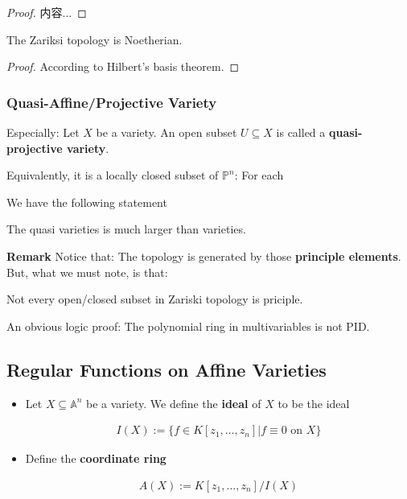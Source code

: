 \documentclass[Total.tex]{subfiles}
\begin{document}
			\begin{proof}
				内容...
			\end{proof}
			
			\begin{proposition}
				The Zariksi topology is Noetherian.
			\end{proposition}
			
			\begin{proof}
				According to Hilbert's basis theorem. 
			\end{proof}
			
			\subsubsection{Quasi-Affine/Projective Variety}
			
			\begin{Def}
				Especially: Let $X$ be a variety. An open subset $U\subseteq X$ is called a \textbf{quasi-projective variety}. 
				
				Equivalently, it is a locally closed subset of $\mathbb{P}^n$: For each 
			\end{Def}
			
			We have the following statement
			
			\begin{center}
				The quasi varieties is much larger than varieties.
			\end{center}
			
			\textbf{Remark} Notice that: The topology is generated by those \textbf{principle elements}. But, what we must note, is that: 
			
			\begin{center}
				Not every open/closed subset in Zariski topology is priciple.
			\end{center}
			
			An obvious logic proof: The polynomial ring in multivariables is not PID.
			
		
		
			\subsection{Regular Functions on Affine Varieties}
			
				\begin{Def}
					\begin{itemize}
						\item Let $X\subseteq \mathbb{A}^n$ be a variety. We define the \textbf{ideal} of $X$ to be the ideal
						
						\begin{gather*}
							I(X):=\{f\in K[z_1,\dots,z_n]|f\equiv 0\mbox{ on }X\}
						\end{gather*}
						
						\item Define the \textbf{coordinate ring}
						
						\begin{gather*}
							A(X):=K[z_1,\dots,z_n]/I(X)
						\end{gather*}
					\end{itemize}
				\end{Def}
				
\end{document}
